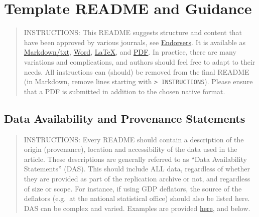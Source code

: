\documentclass[
]{article}
\author{}
\date{}
\begin{document}
\hypertarget{template-readme-and-guidance}{%
\section{Template README and
Guidance}\label{template-readme-and-guidance}}

\begin{quote}
INSTRUCTIONS: This README suggests structure and content that have been
approved by various journals, see
\href{https://social-science-data-editors.github.io/template_README/Endorsers.html}{Endorsers}.
It is available as
\href{https://github.com/social-science-data-editors/template_README/blob/master/template-README.html}{Markdown/txt},
\href{https://social-science-data-editors.github.io/template_README/templates/README.docx}{Word},
\href{https://social-science-data-editors.github.io/template_README/templates/README.tex}{LaTeX},
and
\href{https://social-science-data-editors.github.io/template_README/templates/README.pdf}{PDF}.
In practice, there are many variations and complications, and authors
should feel free to adapt to their needs. All instructions can (should)
be removed from the final README (in Markdown, remove lines starting
with \texttt{\textgreater{}\ INSTRUCTIONS}). Please ensure that a PDF is
submitted in addition to the chosen native format.
\end{quote}

\hypertarget{data-availability-and-provenance-statements}{%
\subsection{Data Availability and Provenance
Statements}\label{data-availability-and-provenance-statements}}

\begin{quote}
INSTRUCTIONS: Every README should contain a description of the origin
(provenance), location and accessibility of the data used in the
article. These descriptions are generally referred to as ``Data
Availability Statements'' (DAS). This should include ALL data,
regardless of whether they are provided as part of the replication
archive or not, and regardless of size or scope. For instance, if using
GDP deflators, the source of the deflators (e.g.~at the national
statistical office) should also be listed here. DAS can be complex and
varied. Examples are provided
\href{https://social-science-data-editors.github.io/template_README/Requested_information_dcas.html}{here},
and below.
\end{quote}
\end{document}
